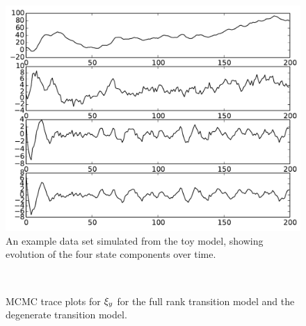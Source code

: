 \documentclass[journal,10pt]{IEEEtran}
\begin{document}
\begin{figure}
 \centering
 \includegraphics[width=0.9\columnwidth]{figures/toy-state.pdf}
 \caption{An example data set simulated from the toy model, showing evolution of the four state components over time.}
 \label{fig:toy-data}
\end{figure}

\begin{figure}
 \centering
  \\
 \caption{MCMC trace plots for $\xi_{y_{}}$ for \protect{} the full rank transition model and \protect{} the degenerate transition model.}
 \label{fig:toy-R-trace}
\end{figure}
\end{document}
